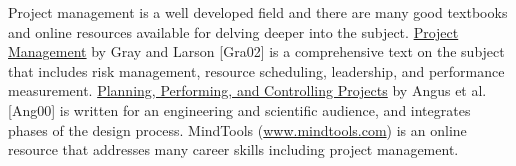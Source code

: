 Project management is a well developed field and there are many good
textbooks and online resources available for delving deeper into the
subject. \ul{Project Management} by Gray and Larson {[}Gra02{]} is a
comprehensive text on the subject that includes risk management,
resource scheduling, leadership, and performance measurement.
\ul{Planning, Performing, and Controlling Projects} by Angus et al.
{[}Ang00{]} is written for an engineering and scientific audience, and
integrates phases of the design process. MindTools
(\href{http://www.mindtools.com}{www.mindtools.com}) is an online
resource that addresses many career skills including project management.
